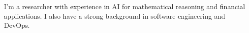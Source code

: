 I'm a researcher with experience in AI for mathematical reasoning and financial applications. I also have a strong background in software engineering and DevOps.
